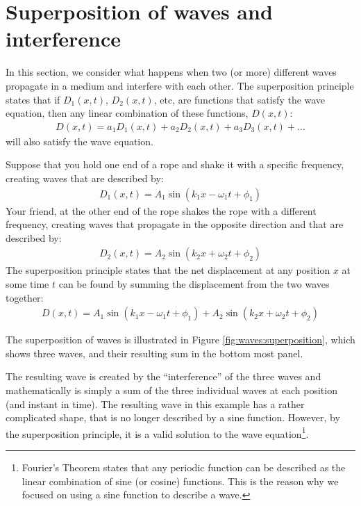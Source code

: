 \section{Superposition of waves and interference}
In this section, we consider what happens when two (or more) different waves propagate in a medium and interfere with each other. The superposition principle states that if $D_1(x,t)$, $D_2(x,t)$, etc, are functions that satisfy the wave equation, then any linear combination of these functions, $D(x,t)$:
\begin{align*}
D(x,t) = a_1D_1(x,t)+a_2D_2(x,t)+a_3D_3(x,t)+\dots
\end{align*}
will also satisfy the wave equation.

Suppose that you hold one end of a rope and shake it with a specific frequency, creating waves that are described by:
\begin{align*}
D_1(x,t) = A_1\sin(k_1x-\omega_1t+\phi_1)
\end{align*}
Your friend, at the other end of the rope shakes the rope with a different frequency, creating waves that propagate in the opposite direction and that are described by:
\begin{align*}
D_2(x,t) = A_2\sin(k_2x+\omega_2t+\phi_2)
\end{align*}
The superposition principle states that the net displacement at any position $x$ at some time $t$ can be found by summing the displacement from the two waves together:
\begin{align*}
D(x,t) = A_1\sin(k_1x-\omega_1t+\phi_1) + A_2\sin(k_2x+\omega_2t+\phi_2)
\end{align*}

The superposition of waves is illustrated in Figure \ref{fig:waves:superposition}, which shows three waves, and their resulting sum in the bottom most panel.

The resulting wave is created by the ``interference'' of the three waves and mathematically is simply a sum of the three individual waves at each position (and instant in time). The resulting wave in this example has a rather complicated shape, that is no longer described by a sine function. However, by the superposition principle, it is a valid solution to the wave equation\footnote{Fourier's Theorem states that any periodic function can be described as the linear combination of sine (or cosine) functions. This is the reason why we focused on using a sine function to describe a wave.}.

